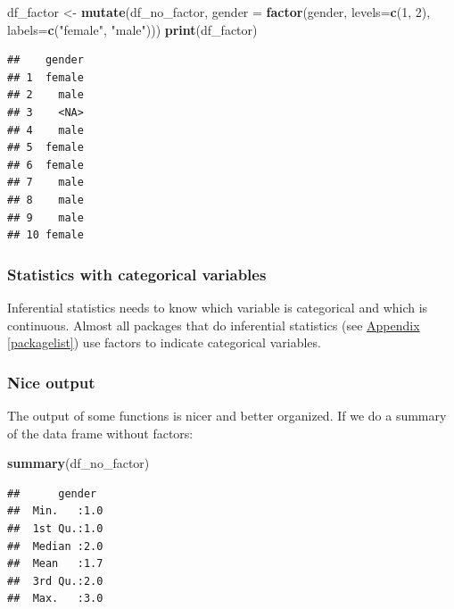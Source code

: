 \documentclass[
]{scrartcl}
\newenvironment{Shaded}{\begin{snugshade}}{\end{snugshade}}
\newcommand{\DataTypeTok}[1]{\textcolor[rgb]{0.13,0.29,0.53}{#1}}
\newcommand{\DecValTok}[1]{\textcolor[rgb]{0.00,0.00,0.81}{#1}}
\newcommand{\KeywordTok}[1]{\textcolor[rgb]{0.13,0.29,0.53}{\textbf{#1}}}
\newcommand{\NormalTok}[1]{#1}
\newcommand{\StringTok}[1]{\textcolor[rgb]{0.31,0.60,0.02}{#1}}
\begin{document}
\begin{Shaded}
\begin{Highlighting}[]
\NormalTok{df\_factor \textless{}{-}}\StringTok{  }\KeywordTok{mutate}\NormalTok{(df\_no\_factor,}
            \DataTypeTok{gender =} \KeywordTok{factor}\NormalTok{(gender, }\DataTypeTok{levels=}\KeywordTok{c}\NormalTok{(}\DecValTok{1}\NormalTok{, }\DecValTok{2}\NormalTok{), }\DataTypeTok{labels=}\KeywordTok{c}\NormalTok{(}\StringTok{"female"}\NormalTok{, }\StringTok{"male"}\NormalTok{)))}
\KeywordTok{print}\NormalTok{(df\_factor)}
\end{Highlighting}
\end{Shaded}

\begin{verbatim}
##    gender
## 1  female
## 2    male
## 3    <NA>
## 4    male
## 5  female
## 6  female
## 7    male
## 8    male
## 9    male
## 10 female
\end{verbatim}

\hypertarget{statistics-with-categorical-variables}{%
\subsubsection{Statistics with categorical variables}\label{statistics-with-categorical-variables}}

Inferential statistics needs to know which variable is categorical and which is continuous. Almost all packages that do inferential statistics (see \protect\hyperlink{packagelist}{Appendix} \ref{packagelist}) use factors to indicate categorical variables.

\hypertarget{nice-output}{%
\subsubsection{Nice output}\label{nice-output}}

The output of some functions is nicer and better organized. If we do a summary of the data frame without factors:

\begin{Shaded}
\begin{Highlighting}[]
\KeywordTok{summary}\NormalTok{(df\_no\_factor)}
\end{Highlighting}
\end{Shaded}

\begin{verbatim}
##      gender   
##  Min.   :1.0  
##  1st Qu.:1.0  
##  Median :2.0  
##  Mean   :1.7  
##  3rd Qu.:2.0  
##  Max.   :3.0
\end{verbatim}
\end{document}
